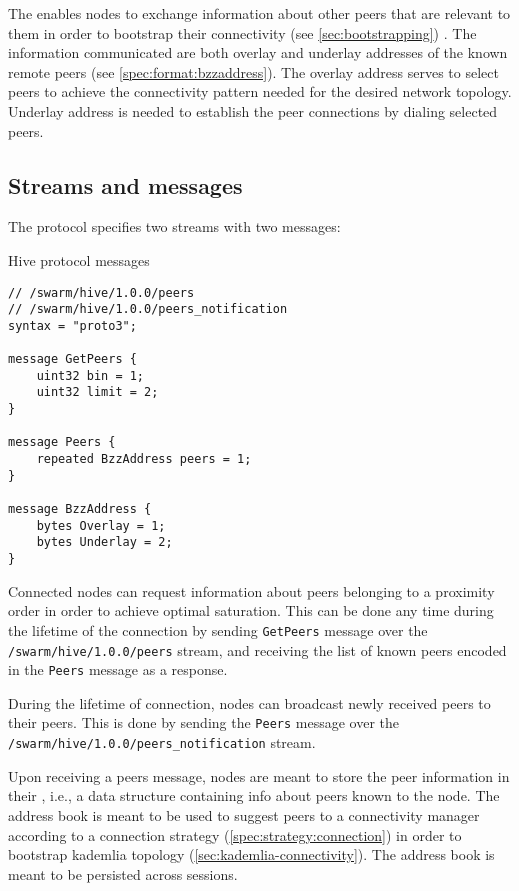 The  enables nodes to exchange information about other peers that are relevant to them in order to bootstrap their connectivity  (see \ref{sec:bootstrapping}) . The information communicated are both overlay and underlay addresses of the known remote peers (see  \ref{spec:format:bzzaddress}). The overlay address serves to select peers to achieve the connectivity pattern needed for the desired network topology. Underlay address is needed to establish the peer connections by dialing selected peers.

\subsection{Streams and messages \statusgreen}

The protocol specifies two streams with two messages:

\begin{definition}{Hive protocol messages}\label{def:hive-messages}

\begin{lstlisting}
// /swarm/hive/1.0.0/peers
// /swarm/hive/1.0.0/peers_notification
syntax = "proto3";

message GetPeers {
    uint32 bin = 1;       
    uint32 limit = 2;
}

message Peers {
    repeated BzzAddress peers = 1;
}

message BzzAddress {
    bytes Overlay = 1;
    bytes Underlay = 2;
}
\end{lstlisting}
\end{definition}

Connected nodes can request information about peers belonging to a proximity order in order to achieve optimal saturation. This can be done any time during the lifetime of the connection by sending \lstinline{GetPeers} message over the \lstinline{/swarm/hive/1.0.0/peers} stream, and receiving the list of known peers encoded in the \lstinline{Peers} message as a response.

During the lifetime of connection, nodes can broadcast newly received peers to their peers. This is done by sending the \lstinline{Peers} message over the \\\lstinline{/swarm/hive/1.0.0/peers_notification} stream.


Upon receiving a peers message, nodes are meant to store the peer information in their , i.e., a data structure containing info about peers known to the node. The address book is meant to be used to suggest peers  to a connectivity manager according to a connection strategy (\ref{spec:strategy:connection}) in order to bootstrap kademlia topology (\ref{sec:kademlia-connectivity}). The address book is meant to be persisted across sessions.

